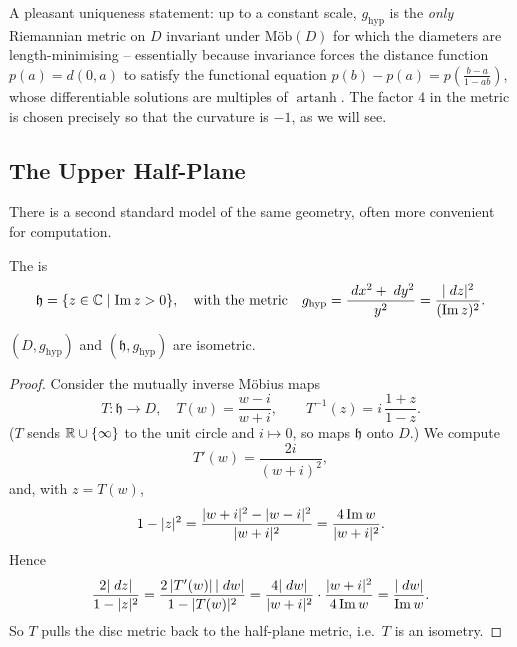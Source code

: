 \documentclass[a4paper]{scrartcl}
\newcommand{\Mob}{\text{M\"ob}}
\DeclareMathOperator{\artanh}{artanh}
\begin{document}
\begin{remark}
    A pleasant uniqueness statement: up to a constant scale, $g_{\mathrm{hyp}}$ is the \emph{only} Riemannian metric on $D$ invariant under $\Mob(D)$ for which the diameters are length-minimising -- essentially because invariance forces the distance function $p(a) = d(0, a)$ to satisfy the functional equation $p(b) - p(a) = p\left(\frac{b - a}{1 - ab}\right)$, whose differentiable solutions are multiples of $\artanh$. The factor $4$ in the metric is chosen precisely so that the curvature is $-1$, as we will see.
\end{remark}

\subsection{The Upper Half-Plane}

There is a second standard model of the same geometry, often more convenient for computation.

\begin{definition}
    The  is
    $$
    \mathfrak{h} = \{z \in \mathbb{C} \mid \operatorname{Im} z > 0\}, \quad \text{with the metric} \quad g_{\mathrm{hyp}} = \frac{\; d x^2 + \; d y^2}{y^2} = \frac{|\; d z|^2}{(\operatorname{Im} z)^2}.
    $$
\end{definition}

\begin{lemma}
    $(D, g_{\mathrm{hyp}})$ and $(\mathfrak{h}, g_{\mathrm{hyp}})$ are isometric.
\end{lemma}
\begin{proof}
    Consider the mutually inverse M\"obius maps
    $$
    T: \mathfrak{h} \rightarrow D, \quad T(w) = \frac{w - i}{w + i}, \qquad T^{-1}(z) = i\,\frac{1 + z}{1 - z}.
    $$
    ($T$ sends $\mathbb{R} \cup \{\infty\}$ to the unit circle and $i \mapsto 0$, so maps $\mathfrak{h}$ onto $D$.) We compute
    $$
    T'(w) = \frac{2i}{(w + i)^2},
    $$
    and, with $z = T(w)$,
    $$
    1 - |z|^2 = \frac{|w + i|^2 - |w - i|^2}{|w+i|^2} = \frac{4 \operatorname{Im} w}{|w + i|^2}.
    $$
    Hence
    $$
    \frac{2|\; d z|}{1 - |z|^2} = \frac{2\,|T'(w)|\,|\; d w|}{1 - |T(w)|^2} = \frac{4 |\; d w|}{|w+i|^2} \cdot \frac{|w+i|^2}{4 \operatorname{Im} w} = \frac{|\; d w|}{\operatorname{Im} w}.
    $$
    So $T$ pulls the disc metric back to the half-plane metric, i.e.\ $T$ is an isometry.
\end{proof}
\end{document}
